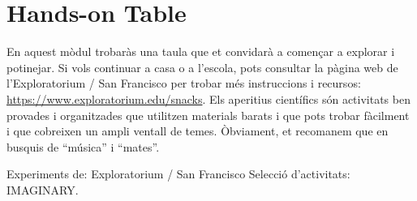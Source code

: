 \section{Hands-on Table}
En aquest mòdul trobaràs una taula que et convidarà a començar a explorar i potinejar. Si vols continuar a casa o a l'escola, pots consultar la pàgina web de l'Exploratorium / San Francisco per trobar més instruccions i recursos: \url{https://www.exploratorium.edu/snacks}. Els aperitius científics són activitats ben provades i organitzades que utilitzen materials barats i que pots trobar fàcilment i que cobreixen un ampli ventall de temes. Òbviament, et recomanem que en busquis de ``música'' i ``mates''.

\vfill

Experiments de: Exploratorium / San Francisco
Selecció d'activitats: IMAGINARY.
